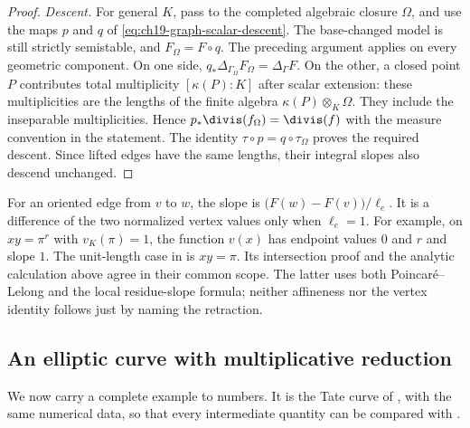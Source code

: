 \begin{proof}
\emph{Descent.}
For general $K$, pass to the completed algebraic closure $\Omega$,
and use the maps $p$ and $q$ of
\eqref{eq:ch19-graph-scalar-descent}.
The base-changed model is still strictly semistable, and
$F_\Omega=F\circ q$.  The preceding argument applies on every
geometric component.  On one side,
$q_*\Delta_{\Gamma_\Omega}F_\Omega=\Delta_\Gamma F$.
On the other, a closed point $P$ contributes total multiplicity
$[\kappa(P):K]$ after scalar extension: these multiplicities are
the lengths of the finite algebra $\kappa(P)\otimes_K\Omega$.
They include the inseparable multiplicities.  Hence
$p_*\divis(f_\Omega)=\divis(f)$ with the measure convention in the
statement.  The identity
$\tau\circ p=q\circ\tau_\Omega$ proves the required descent.
Since lifted edges have the same lengths, their integral slopes
also descend unchanged.
\end{proof}

\begin{remark}
\label{rem:ch19-slope-two-proofs}
For an oriented edge from $v$ to $w$, the slope is
$\bigl(F(w)-F(v)\bigr)/\ell_e$.
It is a difference of the two normalized vertex values only when
$\ell_e=1$.  For example, on $xy=\pi^r$ with $v_K(\pi)=1$,
the function $v(x)$ has endpoint values $0$ and $r$ and slope
$1$.  The unit-length case in  is
$xy=\pi$.  Its intersection proof and the analytic calculation
above agree in their common scope.  The latter uses both
Poincar\'e--Lelong and the local residue-slope formula; neither
affineness nor the vertex identity follows just by naming the
retraction.
\end{remark}

\subsection{An elliptic curve with multiplicative reduction}
\label{sec:ch19-tate-slope}

We now carry a complete example to numbers.  It is the Tate curve of
, with the same numerical data, so that every
intermediate quantity can be compared with .

